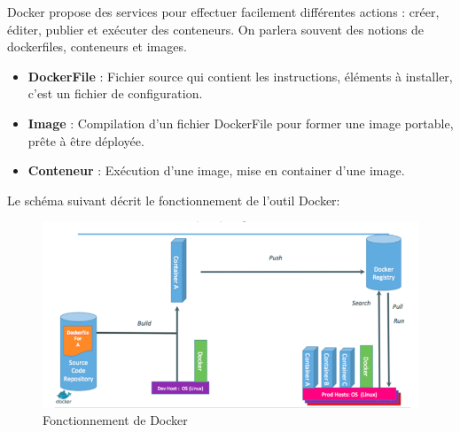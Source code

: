 \begin{onehalfspace}
Docker propose des services pour effectuer facilement différentes actions : créer, éditer, publier et exécuter des conteneurs. On parlera souvent des notions de dockerfiles, conteneurs et  images.

\begin{itemize}
\item \textbf{DockerFile} : Fichier source qui contient les instructions, éléments à installer, c'est un fichier de configuration.
\item \textbf{Image} : Compilation d'un fichier DockerFile pour former une image portable, prête à être déployée.
\item \textbf{Conteneur} : Exécution d'une image, mise en container d'une image.
\end{itemize}


Le schéma suivant décrit le fonctionnement de l'outil Docker: 
\begin{figure}[H]
\centering
\includegraphics [scale=0.6]{chapitre2/assets/utilisation.png}
\caption{Fonctionnement de Docker}
\end{figure}

\end{onehalfspace}
\label{table:} %
